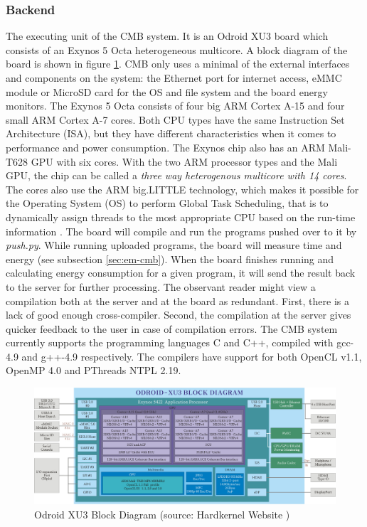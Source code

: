 \subsubsection{Backend} The executing unit of the CMB system. It is an Odroid XU3 board \cite{m:odroid} which consists of an Exynos 5 Octa heterogeneous multicore. A block diagram of the board is shown in figure \ref{fig:odroid-block}. CMB only uses a minimal of the external interfaces and components on the system: the Ethernet port for internet access, eMMC module or MicroSD card for the OS and file system and the board energy monitors. The Exynos 5 Octa consists of four big ARM Cortex A-15 and four small ARM Cortex A-7 cores. Both CPU types have the same Instruction Set Architecture (ISA), but they have different characteristics when it comes to performance and power consumption. The Exynos chip also has an ARM Mali-T628 GPU with six cores. With the two ARM processor types and the Mali GPU, the chip can be called a \textit{three way heterogenous multicore with 14 cores}. The cores also use the ARM big.LITTLE technology, which makes it possible for the Operating System (OS) to perform Global Task Scheduling, that is to dynamically assign threads to the most appropriate CPU based on the run-time information \cite{m:big-little}. The board will compile and run the programs pushed over to it by \textit{push.py}. While running uploaded programs, the board will measure time and energy (see subsection \ref{sec:em-cmb}). When the board finishes running and calculating energy consumption for a given program, it will send the result back to the server for further processing. The observant reader might view a compilation both at the server and at the board as redundant. First, there is a lack of good enough cross-compiler. Second, the compilation at the server gives quicker feedback to the user in case of compilation errors. The CMB system currently supports the programming languages C and C++, compiled with gcc-4.9 and g++-4.9 respectively. The compilers have support for both OpenCL v1.1, OpenMP 4.0 and PThreads NTPL 2.19.

\begin{figure}
    \includegraphics[width=1.0\textwidth]{figs/block-xu3.jpg}
    \caption[Odroid XU3 Block Diagram]{Odroid XU3 Block Diagram (source: Hardkernel Website \cite{m:XU3-block})}
    \label{fig:odroid-block}
\end{figure}

